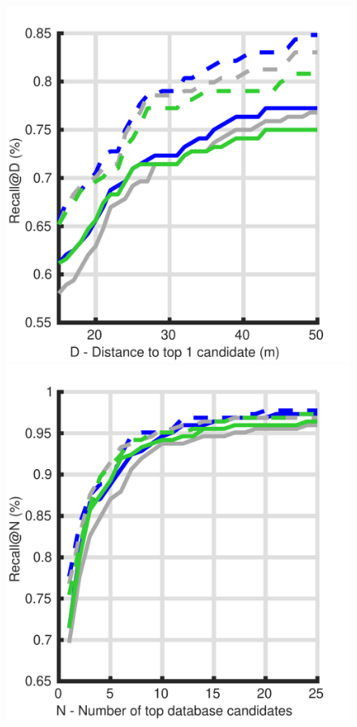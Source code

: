 \begin{figure}
	\centering
	
	\begin{minipage}{0.27\linewidth}
		\center \scriptsize
		\includegraphics[width=\linewidth]{plot/depth_vs_ref/Results_lt_queries/distance}	
		
		\includegraphics[width=\linewidth]{plot/depth_vs_ref/Results_lt_queries/recall}
		

\end{minipage}
\end{figure}
